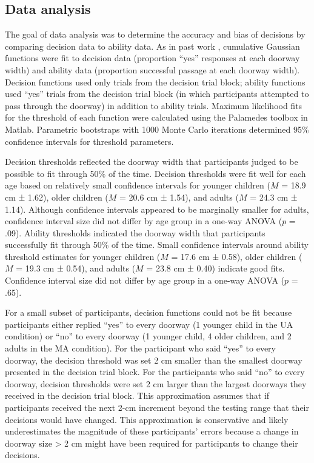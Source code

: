 \documentclass[a4paper,man,natbib,floatsintext,noextraspace]{apa6}
\begin{document}
\subsection{Data analysis}

The goal of data analysis was to determine the accuracy and bias of decisions by comparing decision data to ability data. As in past work \citep{Recal,PregAps}, cumulative Gaussian functions were fit to decision data (proportion “yes” responses at each doorway width) and ability data (proportion successful passage at each doorway width). Decision functions used only trials from the decision trial block; ability functions used “yes” trials from the decision trial block (in which participants attempted to pass through the doorway) in addition to ability trials. Maximum likelihood fits for the threshold of each function were calculated using the Palamedes toolbox \citep{KingdomPrins} in Matlab. Parametric bootstraps with 1000 Monte Carlo iterations determined 95\% confidence intervals for threshold parameters. 

Decision thresholds reflected the doorway width that participants judged to be possible to fit through 50\% of the time. Decision thresholds were fit well for each age based on relatively small confidence intervals for younger children ($M$ = 18.9 cm ± 1.62), older children ($M$ = 20.6 cm ± 1.54), and adults ($M$ = 24.3 cm ± 1.14). Although confidence intervals appeared to be marginally smaller for adults, confidence interval size did not differ by age group in a one-way ANOVA ($p$ = .09). Ability thresholds indicated the doorway width that participants successfully fit through 50\% of the time. Small confidence intervals around ability threshold estimates for younger children ($M$ = 17.6 cm ± 0.58), older children ($M$ = 19.3 cm ± 0.54), and adults ($M$ = 23.8 cm ± 0.40) indicate good fits. Confidence interval size did not differ by age group in a one-way ANOVA ($p$ = .65).

For a small subset of participants, decision functions could not be fit because participants either replied “yes” to every doorway (1 younger child in the UA condition) or “no” to every doorway (1 younger child, 4 older children, and 2 adults in the MA condition). For the participant who said “yes” to every doorway, the decision threshold was set 2 cm smaller than the smallest doorway presented in the decision trial block. For the participants who said “no” to every doorway, decision thresholds were set 2 cm larger than the largest doorways they received in the decision trial block. This approximation assumes that if participants received the next 2-cm increment beyond the testing range that their decisions would have changed. This approximation is conservative and likely underestimates the magnitude of these participants’ errors because a change in doorway size > 2 cm might have been required for participants to change their decisions. 
\end{document}
